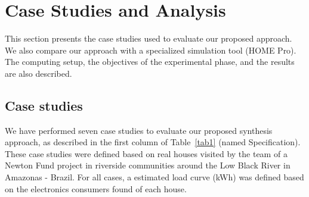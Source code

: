 \documentclass[journal]{IEEEtran}
\begin{document}
\section{Case Studies and Analysis}
\label{sec:Results}

This section presents the case studies used to evaluate our proposed approach. We also compare our approach with a specialized simulation tool (HOME Pro). The computing setup, the objectives of the experimental phase, and the results are also described.

\subsection{Case studies} 

We have performed seven case studies to evaluate our proposed synthesis approach, as described in the first column of Table~\ref{tab1} (named Specification). These case studies were defined based on real houses visited by the team of a Newton Fund project in riverside communities around the Low Black River in Amazonas - Brazil. For all cases, a estimated load curve (kWh) was defined based on the electronics consumers found of each house.
\end{document}
